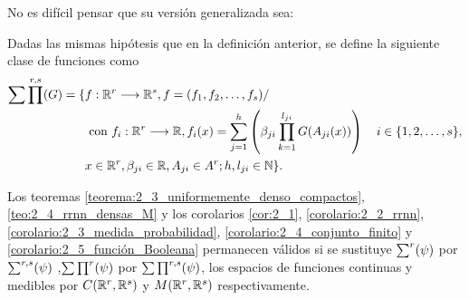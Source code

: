 No es difícil pensar que su versión generalizada sea: 

\begin{definicion} 
    Dadas las mismas hipótesis que en la definición anterior, se define la siguiente clase de funciones como 
    \begin{equation}
        \begin{split}
            \sum \prod^{r, s}(G) 
            = 
        \{ 
            & f: \mathbb{R} ^r \longrightarrow \mathbb{R}^s, f= (f_1, f_2, \ldots , f_s)  / \quad 
            \\ &
            \text{ con } f_i : \mathbb{R} ^r\longrightarrow \mathbb{R}, 
            f_i(x)=\sum_{j = 1} ^h 
            \left(
            \beta_{j i} \prod_{k=1}^{l_{j i}} G(A_{j i}(x))
            \right)
             \quad i \in \{1,2,\ldots, s\}, \\
            & x  \in \mathbb{R} ^r, \beta_{j i} \in \mathbb{R}, A_{j i}\in A^r; h,l_{j i} \in \mathbb{N} 
        \}.
        \end{split}
    \end{equation}
\end{definicion}


\begin{corolario}\label{corolario:2_6}
    Los teoremas 
    \ref{teorema:2_3_uniformemente_denso_compactos},
    \ref{teo:2_4_rrnn_densas_M} 
    y los corolarios
    \ref{cor:2_1}, 
    \ref{corolario:2_2_rrnn},
    \ref{corolario:2_3_medida_probabilidad},
    \ref{corolario:2_4_conjunto_finito}
    y 
    \ref{corolario:2_5_función_Booleana}
    permanecen válidos si se sustituye $\sum^r (\psi)$ por $\sum^{r,s} (\psi)$
    ,$\sum \prod^r (\psi)$ por $\sum \prod^{r,s} (\psi)$, 
    los espacios de funciones continuas y medibles por $C(\mathbb{R}^r ,\mathbb{R}^s)$ y $M(\mathbb{R}^r , \mathbb{R}^s)$ respectivamente.
\end{corolario}


